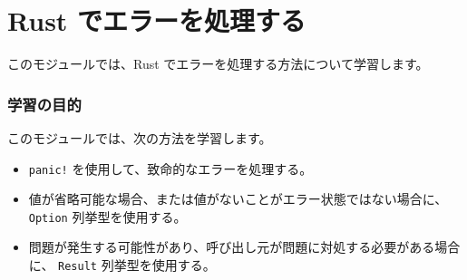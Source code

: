 \section{Rust でエラーを処理する}

このモジュールでは、Rust でエラーを処理する方法について学習します。

\subsubsection{学習の目的}

このモジュールでは、次の方法を学習します。


\begin{itemize}

\item \texttt{panic!} を使用して、致命的なエラーを処理する。
\item 値が省略可能な場合、または値がないことがエラー状態ではない場合に、 \texttt{Option} 列挙型を使用する。
\item 問題が発生する可能性があり、呼び出し元が問題に対処する必要がある場合に、 \texttt{Result} 列挙型を使用する。
\end{itemize}

